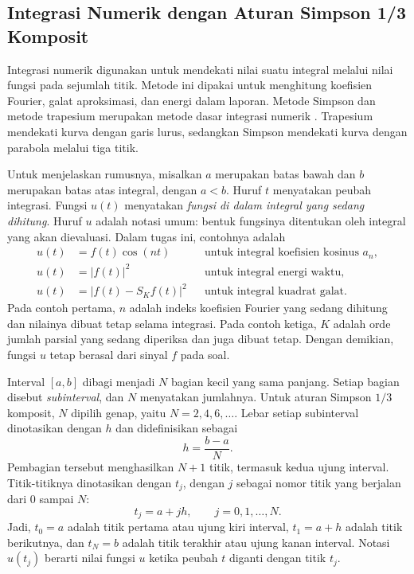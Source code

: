 \documentclass[11pt,a4paper]{article}
\begin{document}
\subsection{Integrasi Numerik dengan Aturan Simpson 1/3 Komposit}
\label{sub:integrasi-numerik}
Integrasi numerik digunakan untuk mendekati nilai suatu integral melalui
nilai fungsi pada sejumlah titik. Metode ini dipakai untuk menghitung
koefisien Fourier, galat aproksimasi, dan energi dalam laporan.
Metode Simpson dan metode trapesium merupakan metode dasar integrasi
numerik \cite{mit_simpson}. Trapesium mendekati kurva dengan garis lurus,
sedangkan Simpson mendekati kurva dengan parabola melalui tiga titik.

Untuk menjelaskan rumusnya, misalkan $a$ merupakan batas bawah dan $b$
merupakan batas atas integral, dengan $a<b$. Huruf $t$ menyatakan peubah
integrasi. Fungsi $u(t)$ menyatakan \emph{fungsi di dalam integral yang
sedang dihitung}. Huruf $u$ adalah notasi umum: bentuk fungsinya ditentukan
oleh integral yang akan dievaluasi. Dalam tugas ini, contohnya adalah
\[
 \begin{aligned}
 u(t)&=f(t)\cos(nt) &&\text{untuk integral koefisien kosinus }a_n,\\
 u(t)&=|f(t)|^2 &&\text{untuk integral energi waktu},\\
 u(t)&=|f(t)-S_Kf(t)|^2 &&\text{untuk integral kuadrat galat}.
 \end{aligned}
\]
Pada contoh pertama, $n$ adalah indeks koefisien Fourier yang sedang
dihitung dan nilainya dibuat tetap selama integrasi. Pada contoh ketiga,
$K$ adalah orde jumlah parsial yang sedang diperiksa dan juga dibuat tetap.
Dengan demikian, fungsi $u$ tetap berasal dari sinyal $f$ pada soal.

Interval $[a,b]$ dibagi menjadi $N$ bagian kecil yang sama panjang.
Setiap bagian disebut \emph{subinterval}, dan $N$ menyatakan jumlahnya.
Untuk aturan Simpson $1/3$ komposit, $N$ dipilih genap, yaitu
$N=2,4,6,\ldots$. Lebar setiap subinterval dinotasikan dengan $h$ dan
didefinisikan sebagai
\[
 h=\frac{b-a}{N}.
\]
Pembagian tersebut menghasilkan $N+1$ titik, termasuk kedua ujung
interval. Titik-titiknya dinotasikan dengan $t_j$, dengan $j$ sebagai
nomor titik yang berjalan dari $0$ sampai $N$:
\[
 t_j=a+jh,\qquad j=0,1,\ldots,N.
\]
Jadi, $t_0=a$ adalah titik pertama atau ujung kiri interval,
$t_1=a+h$ adalah titik berikutnya, dan $t_N=b$ adalah titik terakhir
atau ujung kanan interval. Notasi $u(t_j)$ berarti nilai fungsi $u$
ketika peubah $t$ diganti dengan titik $t_j$.
\end{document}
